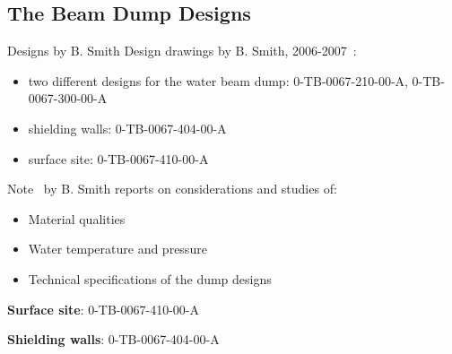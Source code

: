 \documentclass[xcolor={dvipsnames}]{beamer}
\begin{document}

\subsection{The Beam Dump Designs}
\begin{frame}{Designs by B. Smith}
Design drawings by B. Smith, 2006-2007~\cite{Smith}:
\begin{itemize}
 \item two different designs for the water beam dump: 0-TB-0067-210-00-A, 0-TB-0067-300-00-A
 \item shielding walls: 0-TB-0067-404-00-A
 \item surface site: 0-TB-0067-410-00-A
\end{itemize}
\vspace*{0.2cm}
Note~\cite{Smith_Report} by B. Smith reports on considerations and studies of:
\begin{itemize}
 \item Material qualities
 \item Water temperature and pressure
 \item Technical specifications of the dump designs
\end{itemize}
\end{frame}

\begin{frame}{\textbf{Surface site}: 0-TB-0067-410-00-A}
\begin{center}
\end{center}
\end{frame}
\begin{frame}{\textbf{Shielding walls}: 0-TB-0067-404-00-A}
\begin{center}
\end{center}
\end{frame}
\end{document}
